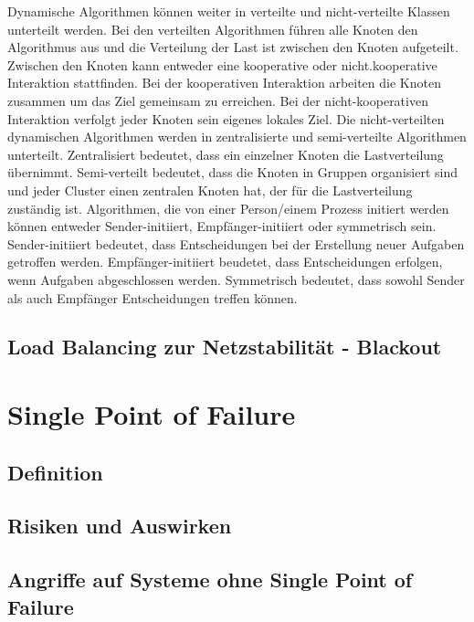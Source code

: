 \documentclass[a4paper,12pt]{article}
\let\stdsection\section
\renewcommand\section{\newpage\stdsection}
\begin{document}
Dynamische Algorithmen können weiter in verteilte und nicht-verteilte Klassen unterteilt werden. Bei den verteilten Algorithmen führen alle Knoten den Algorithmus aus und die Verteilung der Last ist zwischen den Knoten aufgeteilt. Zwischen den Knoten kann entweder eine kooperative oder nicht.kooperative Interaktion stattfinden. Bei der kooperativen Interaktion arbeiten die Knoten zusammen um das Ziel gemeinsam zu erreichen. Bei der nicht-kooperativen Interaktion verfolgt jeder Knoten sein eigenes lokales Ziel. Die nicht-verteilten dynamischen Algorithmen werden in zentralisierte und semi-verteilte Algorithmen unterteilt. Zentralisiert bedeutet, dass ein einzelner Knoten die Lastverteilung übernimmt. Semi-verteilt bedeutet, dass die Knoten in Gruppen organisiert sind und jeder Cluster einen zentralen Knoten hat, der für die Lastverteilung zuständig ist. 
\newline
Algorithmen, die von einer Person/einem Prozess initiert werden können entweder Sender-initiiert, Empfänger-initiiert oder symmetrisch sein.
Sender-initiiert bedeutet, dass Entscheidungen bei der Erstellung neuer Aufgaben getroffen werden. Empfänger-initiiert beudetet, dass Entscheidungen erfolgen, wenn Aufgaben abgeschlossen werden. Symmetrisch bedeutet, dass sowohl Sender als auch Empfänger Entscheidungen treffen können. \cite[S. 3]{LoadBalancing}

\subsection{Load Balancing zur Netzstabilität - Blackout}

\section{Single Point of Failure}
\subsection{Definition}
\subsection{Risiken und Auswirken}
\subsection{Angriffe auf Systeme ohne Single Point of Failure}



\end{document}
